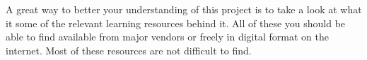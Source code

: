 

A great way to better your understanding of this project is to take a look at what it some of the relevant learning resources behind it. All of these you should be able to find available from major vendors or freely in digital format on the internet. Most of these resources are not difficult to find.





\StopChapter


